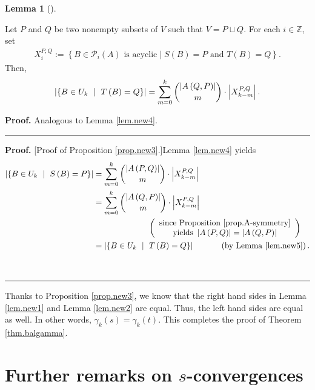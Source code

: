 \documentclass[numbers=enddot,12pt,final,onecolumn,notitlepage]{scrartcl}%
\theoremstyle{definition}
\newtheorem{lem}[theo]{Lemma}
\newenvironment{lemma}[1][]
{\begin{lem}[#1]\begin{leftbar}}
{\end{leftbar}\end{lem}}
\newenvironment{proof}[1][Proof]{\noindent\textbf{#1.} }{\ \rule{0.5em}{0.5em}}
\let\sumnonlimits\sum
\renewcommand{\sum}{\sumnonlimits\limits}
\theoremstyle{plainsl}
\begin{document}
\begin{lemma}
\label{lem.new5} Let $P$ and $Q$ be two nonempty subsets of $V$ such that
$V=P\sqcup Q$. For each $i \in\mathbb{Z}$, set
\begin{align*}
X_{i}^{P,Q} := \left\{ B \in\mathcal{P}_{i}(A) \text{ is acyclic} \mid S(B) =
P \text{ and } T(B) = Q\right\} .
\end{align*}
Then,%
\[
\left\vert \left\{  B\in U_{k}\ \mid\ T\left(  B\right)  =Q\right\}
\right\vert =\sum_{m=0}^{k}\dbinom{\left\vert A\left(  Q,P\right)  \right\vert
}{m}\cdot\left\vert X_{k-m}^{P,Q}\right\vert .
\]

\end{lemma}

\begin{proof}
Analogous to Lemma \ref{lem.new4}.
\end{proof}

\begin{proof}
[Proof of Proposition \ref{prop.new3}.]Lemma \ref{lem.new4} yields%
\begin{align*}
\left\vert \left\{  B\in U_{k}\ \mid\ S\left(  B\right)  =P\right\}
\right\vert  &  =\sum_{m=0}^{k}\dbinom{\left\vert A\left(  P,Q\right)
\right\vert }{m}\cdot\left\vert X_{k-m}^{P,Q}\right\vert \\
&  =\sum_{m=0}^{k}\dbinom{\left\vert A\left(  Q,P\right)  \right\vert }%
{m}\cdot\left\vert X_{k-m}^{P,Q}\right\vert \\
&  \ \ \ \ \ \ \ \ \ \ \ \ \ \ \ \ \ \ \ \ \left(
\begin{array}
[c]{c}%
\text{since Proposition \ref{prop.A-symmetry}}\\
\text{yields }\left\vert A\left(  P,Q\right)  \right\vert =\left\vert A\left(
Q,P\right)  \right\vert
\end{array}
\right) \\
&  =\left\vert \left\{  B\in U_{k}\ \mid\ T\left(  B\right)  =Q\right\}
\right\vert \ \ \ \ \ \ \ \ \ \ \left(  \text{by Lemma \ref{lem.new5}}\right)
.
\end{align*}

\end{proof}

Thanks to Proposition \ref{prop.new3}, we know that the right hand sides in
Lemma \ref{lem.new1} and Lemma \ref{lem.new2} are equal. Thus, the left hand
sides are equal as well. In other words, $\gamma_{k}\left(  s\right)
=\gamma_{k}\left(  t\right)  $. This completes the proof of Theorem
\ref{thm.balgamma}.

\section{Further remarks on $s$-convergences}
\end{document}
